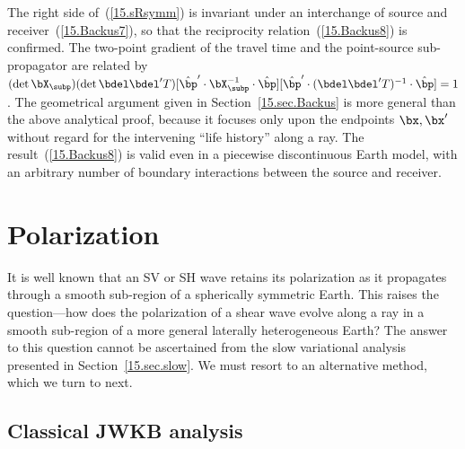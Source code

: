\en
The right side of~(\ref{15.sRsymm}) is invariant under an
interchange of source and receiver~(\ref{15.Backus7}),
so that the reciprocity relation~(\ref{15.Backus8})
is confirmed.  The two-point gradient of the travel
time and the point-source sub-propagator are related by
$({\rm det}\,\bX_{\subp})({\rm det}\,\bdel\bdel^{\prime}T)
[\hat{\bp}'\cdot\bX_{\subp}^{-1}\cdot\hat{\bp}]
[\hat{\bp}'\cdot(\bdel\bdel^{\prime}T)^{-1}\cdot\hat{\bp}]=1$.
The geometrical argument given in Section~\ref{15.sec.Backus}
is more general than the above analytical proof, because it focuses
only upon the endpoints $\bx,\bx'$ without regard for the intervening
``life history'' along a ray.  The result~(\ref{15.Backus8}) is valid
%
even in a piecewise discontinuous Earth model, with an arbitrary number
of boundary interactions between the source and receiver.
%
%

\renewcommand{\thesection}{$\!\!\!\raise1.3ex\hbox{$\star$}\!\!$
\arabic{chapter}.\arabic{section}}
\section{Polarization}
%
%
\renewcommand{\thesection}{\arabic{chapter}.\arabic{section}}

It is well known that an SV or SH wave retains its
polarization as it propagates through a smooth
sub-region of a spherically symmetric Earth.  This raises
the question---how does the polarization of a shear wave
evolve along a ray in a smooth sub-region of a more general laterally
heterogeneous Earth?  The answer to this question cannot be
ascertained from the slow variational analysis presented in
Section~\ref{15.sec.slow}.  We must resort to an alternative
method, which we turn to next.
%

\renewcommand{\thesubsection}{$\!\!\!\raise1.3ex\hbox{$\star$}\!\!$
\arabic{chapter}.\arabic{section}.\arabic{subsection}}
\subsection{Classical JWKB analysis}
%
\renewcommand{\thesubsection}{\arabic{chapter}.\arabic{section}.\arabic{subsection}}

